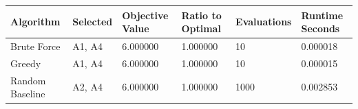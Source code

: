 \begin{tabular}{llllll}
\hline
Algorithm & Selected & Objective Value & Ratio to Optimal & Evaluations & Runtime Seconds \\
\hline
Brute Force & {A1, A4} & 6.000000 & 1.000000 & 10 & 0.000018 \\
Greedy & {A1, A4} & 6.000000 & 1.000000 & 10 & 0.000015 \\
Random Baseline & {A2, A4} & 6.000000 & 1.000000 & 1000 & 0.002853 \\
\hline
\end{tabular}
